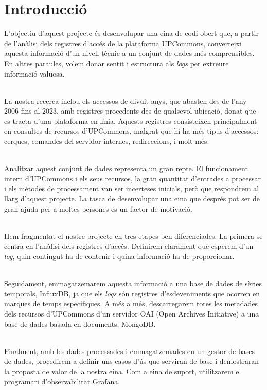 \chapter*{Introducció}\label{ch:introduction}

L'objectiu d'aquest projecte és desenvolupar una eina de codi obert que, a partir de l'anàlisi dels registres d'accés de la plataforma \gls{UPCommons}, converteixi aquesta informació d'un nivell tècnic a un conjunt de dades més comprensibles.
En altres paraules, volem donar sentit i estructura als \textit{\gls{log}s} per extreure informació valuosa.

\noindent \\
La nostra recerca inclou els accessos de divuit anys, que abasten des de l'any 2006 fins al 2023, amb registres procedents des de qualsevol ubicació, donat que es tracta d'una plataforma en línia.
Aquests registres consisteixen principalment en consultes de recursos d'\gls{UPCommons}, malgrat que hi ha més tipus d'accessos: cerques, comandes del servidor internes, redireccions, i molt més.

\noindent \\
Analitzar aquest conjunt de dades representa un gran repte.
El funcionament intern d'\gls{UPCommons} i els seus recursos, la gran quantitat d'entrades a processar i els mètodes de processament van ser incerteses inicials, però que respondrem al llarg d'aquest projecte.
La tasca de desenvolupar una eina que després pot ser de gran ajuda per a moltes persones és un factor de motivació.

\noindent \\
Hem fragmentat el nostre projecte en tres etapes ben diferenciades.
La primera se centra en l'anàlisi dels registres d'accés.
Definirem clarament què esperem d'un \textit{\gls{log}}, quin contingut ha de contenir i quina informació ha de proporcionar.

\noindent \\
Seguidament, emmagatzemarem aquesta informació a una base de dades de sèries temporals, InfluxDB, ja que els \textit{\gls{log}s} són registres d'esdeveniments que ocorren en marques de temps específiques.
A més a més, descarregarem totes les metadades dels recursos d'\gls{UPCommons} d'un servidor OAI (Open Archives Initiative) a una base de dades basada en documents, MongoDB.

\noindent \\
Finalment, amb les dades processades i emmagatzemades en un gestor de bases de dades, procedirem a definir uns casos d'ús que serviran de base i demostraran la proposta de valor de la nostra eina.
Com a eina de suport, utilitzarem el programari d'observabilitat Grafana.

